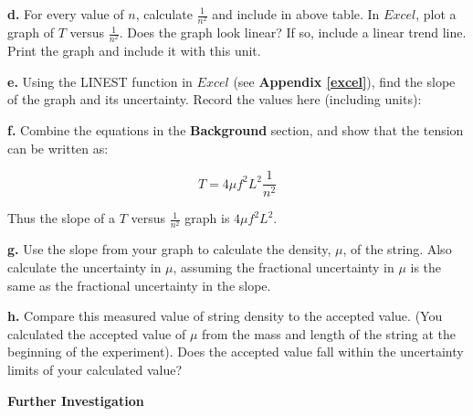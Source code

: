 \textbf{d. } For every value of $n$, calculate $\frac{1}{n^2}$ and include in above table. In $Excel$, plot a graph of $T$ versus $\frac{1}{n^2}$.
Does the graph look linear? If so, include a linear trend line. Print the graph and include it with this unit.
\vspace{20mm}

\textbf{e. } Using the LINEST function in $Excel$ (see \textbf{Appendix \ref{excel}}), find the slope of the graph and its uncertainty. Record the values here
(including units):

\vspace{20mm}

\textbf{f. } Combine the equations in the \textbf{Background } section, and show that the tension can be written as:

\begin{equation}
T=4\mu f^{2}L^{2}\frac{1}{n^2}
\end{equation}

\vspace{25mm}

Thus the slope of a $T$ versus $\frac{1}{n^2}$ graph is $4\mu f^{2}L^{2}$.

\textbf{g. } Use the slope from your graph to calculate the density, $\mu $, of the string. Also calculate the uncertainty in $\mu$, assuming the
fractional uncertainty in $\mu$ is the same as the fractional uncertainty in the slope.

\vspace{5cm}

\textbf{h. } Compare this measured value of string density to the accepted value. (You calculated the accepted value of $\mu $ from the mass and
length of the string at the beginning of the experiment). Does the accepted value fall within the uncertainty limits of your calculated value?

\vspace{50mm}




\textbf{Further Investigation}


